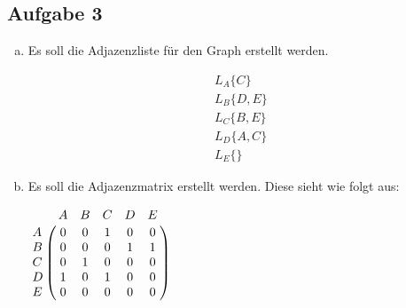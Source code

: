 \documentclass[11pt]{article}
\begin{document}
\subsection*{Aufgabe 3}
\begin{enumerate}[a)]
	
\item
Es soll die Adjazenzliste für den Graph erstellt werden.

\begin{align*}
L_A \{C\}\\
L_B \{D,E\}\\
L_C \{B,E\}\\
L_D \{A,C\}\\
L_E \{\}
\end{align*}

\item
Es soll die Adjazenzmatrix erstellt werden. Diese sieht wie folgt aus:

 $
 \bordermatrix{
 	  & A	& B   & C   & D & E  \cr
 	A & 0   & 0   & 1   & 0 & 0  \cr
 	B & 0   & 0   & 0   & 1 & 1  \cr
 	C & 0   & 1   & 0   & 0 & 0  \cr
 	D & 1   & 0   & 1   & 0 & 0  \cr
 	E & 0   & 0   & 0   & 0 & 0  \cr
 }
 $  
	
	\end{enumerate}
  
\end{document}
